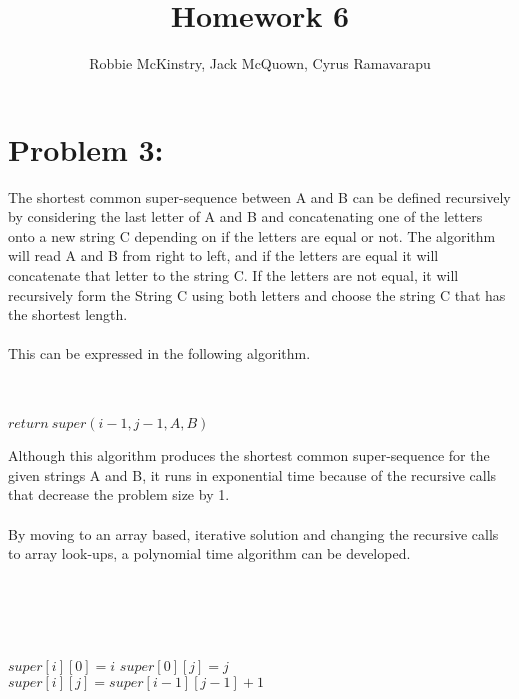 \documentclass[12pt]{article}
\begin{document}
\title{Homework 6}
\author{Robbie McKinstry, Jack McQuown, Cyrus Ramavarapu}
\renewcommand{\today}{13 September 2016}
\renewcommand{\baselinestretch}{1.5}

\maketitle

\section*{Problem 3: }
The shortest common super-sequence between A and B can be defined recursively by considering
the last letter of A and B and concatenating one of the letters onto a new string C depending on if the letters are equal or not.
The algorithm will read A and B from right to left, and if the letters are equal it will concatenate that letter to the string C. If the letters are not equal, it will recursively form the String C using both letters and choose the string C that has the shortest length.\\\\
This can be expressed in the following algorithm.\\\\
\begin{algorithm}[H]
\\
{$return\ super(i - 1, j - 1, A, B)$}
\end{algorithm}
Although this algorithm produces the shortest common super-sequence for the given strings A and B, it runs in exponential time because of the recursive calls that decrease the problem size by 1.\\\\
By moving to an array based, iterative solution and changing the recursive calls to array look-ups, a polynomial time algorithm can be developed.\\\\

\begin{algorithm}[H]
\\
\Init\\
\\
{$super[i][0] = i$}
{$super[0][j] = j$}
\Calc\\
{
{
{$super[i][j] = super[i - 1][j - 1] + 1$}
}
}
\end{algorithm}
\end{document}
